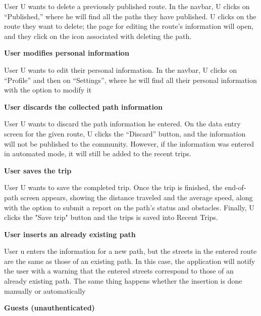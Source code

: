     \noindent
    User U wants to delete a previously published route. In the navbar, U clicks on “Published,” where he will find all the paths they have published. U clicks on the route they want to delete; the page for editing the route’s information will open, and they click on the icon associated with deleting the path.

    \vspace{3mm}
    \noindent
    \textbf{User modifies personal information}
    \vspace{1mm}
    
    \noindent
    User U wants to edit their personal information. In the navbar, U clicks on “Profile” and then on “Settings”, where he will find all their personal information with the option to modify it

    \noindent
    \textbf{User discards the collected path information}
    \vspace{1mm}
    
    \noindent
    User U wants to discard the path information he entered. On the data entry screen for the given route, U clicks the “Discard” button, and the information will not be published to the community. However, if the information was entered in automated mode, it will still be added to the recent trips.

    \vspace{3mm}
    \noindent
    \textbf{User saves the trip}
    \vspace{1mm}
    
    \noindent
    User U wants to save the completed trip. Once the trip is finished, the end-of-path screen appears, showing the distance traveled and the average speed, along with the option to submit a report on the path’s status and obstacles. Finally, U clicks the "Save trip" button and the trips is saved into Recent Trips.


    \vspace{3mm}
    \noindent
    \textbf{User inserts an already existing path}
    \vspace{1mm}
    
    \noindent
    User u enters the information for a new path, but the streets in the entered route are the same as those of an existing path. In this case, the application will notify the user with a warning that the entered streets correspond to those of an already existing path. The same thing happens whether the insertion is done manually or automatically

    \vspace{3mm}
    \newpage
    \noindent
    \textbf{Guests (unauthenticated)} 
    \vspace{2mm}
    
